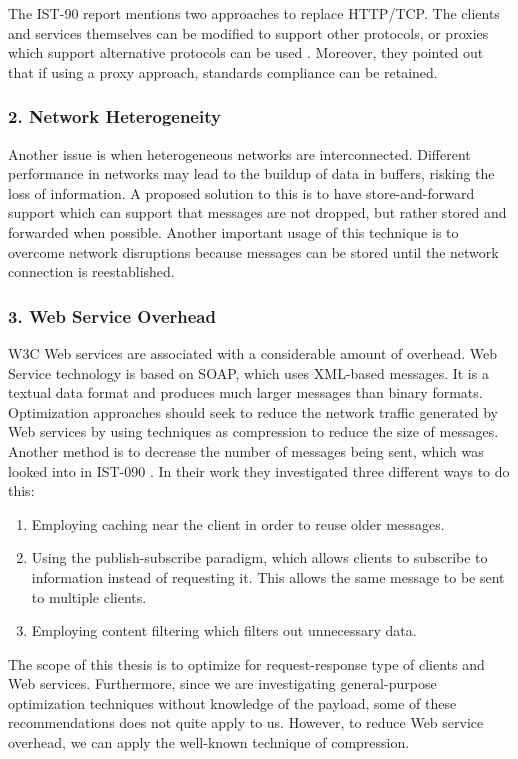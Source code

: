 The IST-90 report mentions two approaches to replace HTTP/TCP. The clients and
services themselves can be modified to support other protocols, or proxies
which support alternative protocols can be used \cite{ist-090}. Moreover, they
pointed out that if using a proxy approach, standards compliance can be
retained.


\subsubsection{2. Network Heterogeneity}

Another issue is when heterogeneous networks are interconnected. Different
performance in networks may lead to the buildup of data in buffers, risking the
loss of information. A proposed solution to this is to have store-and-forward
support which can support that messages are not dropped, but rather stored and
forwarded when possible. Another important usage of this technique is to
overcome network disruptions because messages can be stored until the network
connection is reestablished.


\subsubsection{3. Web Service Overhead}

W3C Web services are associated with a considerable amount of overhead. Web
Service technology is based on SOAP, which uses XML-based messages. It is a
textual data format and produces much larger messages than binary formats.
Optimization approaches should seek to reduce the network traffic generated by
Web services by using techniques as compression to reduce the size of messages.
Another method is to decrease the number of messages being sent, which was
looked into in IST-090 \cite{ist-090}. In their work they investigated three
different ways to do this:

\begin{enumerate}
    \item Employing caching near the client in order to reuse older messages.
    \item Using the publish-subscribe paradigm, which allows clients to subscribe to
    information instead of requesting it. This allows the same message to be sent
    to multiple clients.
    \item Employing content filtering which filters out unnecessary data.
\end{enumerate}

The scope of this thesis is to optimize for request-response type of clients and
Web services. Furthermore, since we are investigating general-purpose
optimization techniques without knowledge of the payload, some of these
recommendations does not quite apply to us. However, to reduce Web service
overhead, we can apply the well-known technique of compression.

